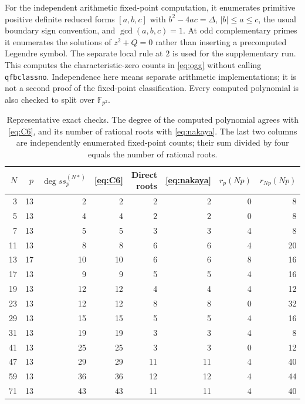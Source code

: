 \documentclass[11pt,a4paper]{article}
\theoremstyle{remark}\newtheorem{remark}[theorem]{Remark}
\numberwithin{equation}{section}
\begin{document}
	For the independent arithmetic fixed-point computation, it enumerates primitive positive definite reduced forms $[a,b,c]$ with $b^2-4ac=\Delta$, $|b|\leq a\leq c$, the usual boundary sign convention, and $\gcd(a,b,c)=1$. At odd complementary primes it enumerates the solutions of $z^2+Q=0$ rather than inserting a precomputed Legendre symbol. The separate local rule at $2$ is used for the supplementary run. This computes the characteristic-zero counts in \eqref{eq:ogg} without calling \texttt{qfbclassno}. Independence here means separate arithmetic implementations; it is not a second proof of the fixed-point classification. Every computed polynomial is also checked to split over $\mathbb F_{p^2}$.

	\begin{table}[ht]
		\centering
		\caption{Representative exact checks. The degree of the computed polynomial agrees with \eqref{eq:C6}, and its number of rational roots with \eqref{eq:nakaya}. The last two columns are independently enumerated fixed-point counts; their sum divided by four equals the number of rational roots.}
		\label{tab:checks}
		\begin{tabular}{rrrrrrrr}\toprule
			$N$&$p$&$\deg ss_p^{(N*)}$&\eqref{eq:C6}&Direct roots&\eqref{eq:nakaya}&$r_p(Np)$&$r_{Np}(Np)$\\\midrule
			3 & 13 & 2 & 2 & 2 & 2 & 0 & 8 \\
			5 & 13 & 4 & 4 & 2 & 2 & 0 & 8 \\
			7 & 13 & 5 & 5 & 3 & 3 & 4 & 8 \\
			11 & 13 & 8 & 8 & 6 & 6 & 4 & 20 \\
			13 & 17 & 10 & 10 & 6 & 6 & 8 & 16 \\
			17 & 13 & 9 & 9 & 5 & 5 & 4 & 16 \\
			19 & 13 & 12 & 12 & 4 & 4 & 4 & 12 \\
			23 & 13 & 12 & 12 & 8 & 8 & 0 & 32 \\
			29 & 13 & 15 & 15 & 5 & 5 & 4 & 16 \\
			31 & 13 & 19 & 19 & 3 & 3 & 4 & 8 \\
			41 & 13 & 25 & 25 & 3 & 3 & 0 & 12 \\
			47 & 13 & 29 & 29 & 11 & 11 & 4 & 40 \\
			59 & 13 & 36 & 36 & 12 & 12 & 4 & 44 \\
			71 & 13 & 43 & 43 & 11 & 11 & 4 & 40 \\
			\bottomrule\end{tabular}
	\end{table}
\end{document}
